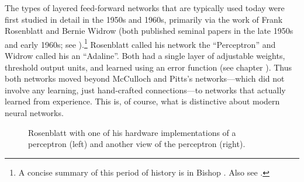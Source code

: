 The types of layered feed-forward networks that  are typically used today were first studied in detail in the 1950s and 1960s, primarily via the work of Frank Rosenblatt and Bernie Widrow (both published seminal papers in the late 1950s and early 1960s; see \cite{widrow1960adaptive}).\footnote{A concise summary of this period of history is in Bishop \cite[p.~98]{bishop1995neural}. Also see \cite{widrow1960adaptive}.}  Rosenblatt called his network the ``Perceptron'' and Widrow called his an ``Adaline''. Both had a single layer of adjustable weights, threshold output units, and learned using an error function (see chapter ). Thus both networks moved beyond McCulloch and Pitts's networks---which did not involve any learning, just hand-crafted connections---to networks that actually learned from experience. This is, of course, what is distinctive about modern neural networks.

\begin{figure}[h]
\centering
{}
\caption[Left: ; Right: ]{Rosenblatt with one of his hardware implementations of a perceptron (left) and another view of the perceptron (right). }
\label{perceptron}
\end{figure}

